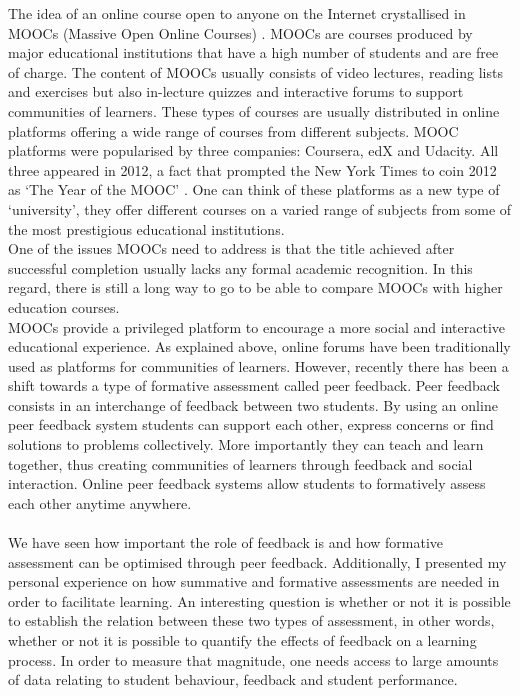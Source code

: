 \documentclass[11pt, oneside]{article}   	%
\begin{document}
The idea of an online course open to anyone on the Internet crystallised in MOOCs (Massive Open Online Courses) \cite{YearOfMooc}. MOOCs are courses produced by major educational institutions that have a high number of students and are free of charge. The content of MOOCs usually consists of video lectures, reading lists and exercises but also in-lecture quizzes and interactive forums to support communities of learners. These types of courses are usually distributed in online platforms offering a wide range of courses from different subjects. MOOC platforms were popularised by three companies: Coursera, edX and Udacity. All three appeared in 2012, a fact that prompted the New York Times to coin 2012 as `The Year of the MOOC' \cite{YearOfMooc}. One can think of these platforms as a new type of `university', they offer different courses on a varied range of subjects from some of the most prestigious educational institutions.\\
One of the issues MOOCs need to address is that the title achieved after successful completion usually lacks any formal academic recognition. In this regard, there is still a long way to go to be able to compare MOOCs with higher education courses.\\
MOOCs provide a privileged platform to encourage a more social and interactive educational experience. As explained above, online forums have been traditionally used as platforms for communities of learners. However, recently there has been a shift towards a type of formative assessment called peer feedback. Peer feedback consists in an interchange of feedback between two students. By using an online peer feedback system students can support each other, express concerns or find solutions to problems collectively. More importantly they can teach and learn together, thus creating communities of learners through feedback and social interaction. Online peer feedback systems allow students to formatively assess each other anytime anywhere.\\\\
We have seen how important the role of feedback is and how formative assessment can be optimised through peer feedback. Additionally, I presented my personal experience on how summative and formative assessments are needed in order to facilitate learning. An interesting question is whether or not it is possible to establish the relation between these two types of assessment, in other words, whether or not it is possible to quantify the effects of feedback on a learning process. In order to measure that magnitude, one needs access to large amounts of data relating to student behaviour, feedback and student performance. %
\end{document}

